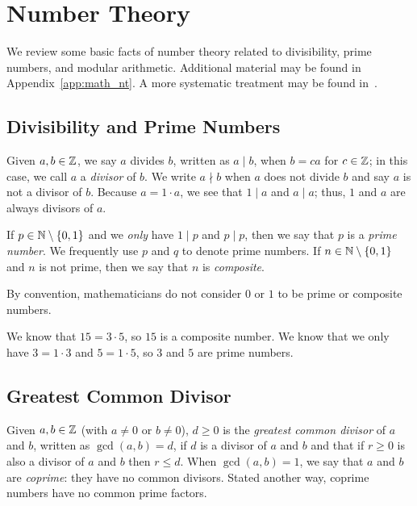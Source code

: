 \section{Number Theory}

We review some basic facts of \gls{number theory} related to divisibility,
prime numbers, and modular arithmetic.
Additional material may be found in Appendix~\ref{app:math_nt}.
A more systematic treatment
may be found in~\cite{ComputationalIntroNTA}.

\subsection{Divisibility and Prime Numbers}

Given $a,b\in\mathbb{Z}$, we say $a$ divides $b$, written as $a\mid b$, when
$b = ca$ for $c\in\mathbb{Z}$;
in this case, we call $a$ a \emph{divisor} of $b$.
We write $a\nmid b$ when $a$ does not divide $b$ and say $a$ is not
a divisor of $b$.
Because $a = 1\cdot a$, we see that $1\mid a$ and $a\mid a$;
thus, $1$ and $a$ are always divisors of $a$.

If $p\in\mathbb{N}\setminus\left\{ 0,1 \right\}$ and we \emph{only} have
$1\mid p$ and $p\mid p$,
then we say that $p$ is a \emph{prime number}.
We frequently use $p$ and $q$ to denote prime numbers.
If $n\in\mathbb{N}\setminus\left\{ 0,1 \right\}$ and $n$ is not prime,
then we say that $n$ is \emph{composite}.

By convention, mathematicians do not consider $0$ or $1$
to be prime or composite numbers.

\begin{example}
We know that $15 = 3\cdot 5$, so $15$ is a composite number.
We know that we only have $3 = 1\cdot 3$ and $5 = 1\cdot 5$,
so $3$ and $5$ are prime numbers.
\end{example}

\subsection{Greatest Common Divisor}

Given $a,b\in\mathbb{Z}$ (with $a\ne0$ or $b\ne0$), $d\ge0$ is the
\emph{greatest common divisor} of $a$ and $b$, written as
$\gcd(a,b) = d$, if $d$ is a divisor of $a$ and $b$ and that
if $r\ge0$ is also a divisor of $a$ and $b$ then $r\le d$.
When $\gcd(a,b) = 1$, we say that $a$ and $b$ are \emph{coprime}:
they have no common divisors.
Stated another way, coprime numbers have no common prime factors.


